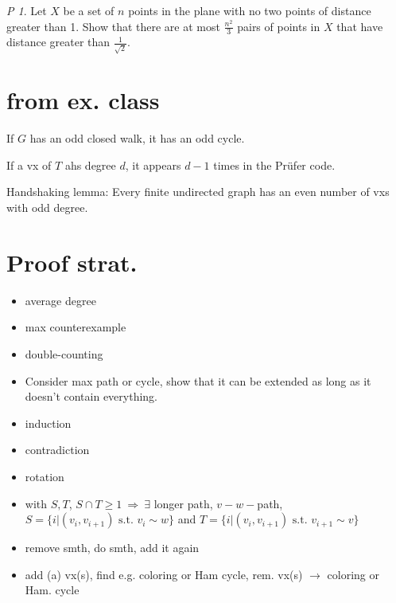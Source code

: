 \documentclass[11pt, fleqn, a4paper, landscape]{article}
\theoremstyle{plain} %
\theoremstyle{remark} %
\newtheorem{problem}{P}
\theoremstyle{definition} %
\begin{document}
\begin{multicols}{5}
\begin{problem}
Let $X$ be a set of $n$ points in the plane with no two points of distance greater than 1. Show that there are at most $\frac{n^2}{3}$ pairs of points in $X$ that have distance greater than $\frac{1}{\sqrt{2}}$.
\end{problem}

\section{from ex. class}

If $G$ has an odd closed walk, it has an odd cycle.

If a vx of $T$ ahs degree $d$, it appears $d-1$ times in the Prüfer code.

Handshaking lemma: Every finite undirected graph has an even number of vxs with odd degree.

\section{Proof strat.}

\begin{itemize}
	\item average degree 
	\item max counterexample 
	\item double-counting
	\item Consider max path or cycle, show that it can be extended as long as it doesn't contain everything.
	\item induction
	\item contradiction
	\item rotation
	\item with $S,T$, $S\cap T\ge 1\ \Rightarrow\ \exists$ longer path, $v-w-$path, $S=\{i|(v_i,v_{i+1})\text{ s.t. }v_i\sim w\}$ and $T=\{i|(v_i,v_{i+1})\text{ s.t. }v_{i+1}\sim v\}$
	\item remove smth, do smth, add it again
	\item add (a) vx(s), find e.g. coloring or Ham cycle, rem. vx(s) $\rightarrow$ coloring or Ham. cycle
\end{itemize}


\end{multicols}
\end{document}
